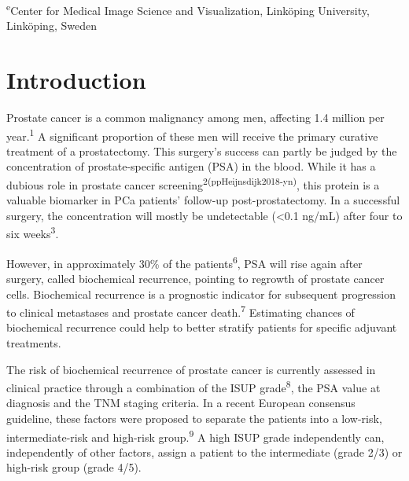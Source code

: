 \documentclass[
  12pt,
  a5,margin=2cmpaper,
]{article}
\begin{document}
\textsuperscript{e}Center for Medical Image Science and Visualization,
Linköping University, Linköping, Sweden

\hypertarget{introduction}{%
\section{Introduction}\label{introduction}}

Prostate cancer is a common malignancy among men, affecting 1.4 million
per year.\textsuperscript{1} A significant proportion of these men will
receive the primary curative treatment of a prostatectomy. This
surgery's success can partly be judged by the concentration of
prostate-specific antigen (PSA) in the blood. While it has a dubious
role in prostate cancer
screening\textsuperscript{2(ppHeijnsdijk2018-yn)}, this protein is a
valuable biomarker in PCa patients' follow-up post-prostatectomy. In a
successful surgery, the concentration will mostly be undetectable
(\textless0.1 ng/mL) after four to six weeks\textsuperscript{3}.

However, in approximately 30\% of the patients\textsuperscript{6}, PSA
will rise again after surgery, called biochemical recurrence, pointing
to regrowth of prostate cancer cells. Biochemical recurrence is a
prognostic indicator for subsequent progression to clinical metastases
and prostate cancer death.\textsuperscript{7} Estimating chances of
biochemical recurrence could help to better stratify patients for
specific adjuvant treatments.

The risk of biochemical recurrence of prostate cancer is currently
assessed in clinical practice through a combination of the ISUP
grade\textsuperscript{8}, the PSA value at diagnosis and the TNM staging
criteria. In a recent European consensus guideline, these factors were
proposed to separate the patients into a low-risk, intermediate-risk and
high-risk group.\textsuperscript{9} A high ISUP grade independently can,
independently of other factors, assign a patient to the intermediate
(grade 2/3) or high-risk group (grade 4/5).
\end{document}
